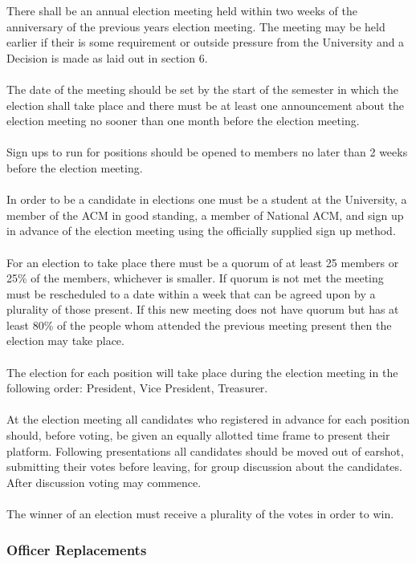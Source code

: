 \documentclass[12pt,titlepage]{article}
\begin{document}
There shall be an annual election meeting held within two weeks of the anniversary of the previous years election meeting. The meeting may be held earlier if their is some requirement or outside pressure from the University and a Decision is made as laid out in section 6.\\
\\
The date of the meeting should be set by the start of the semester in which the election shall take place and there must be at least one announcement about the election meeting no sooner than one month before the election meeting.\\
\\
Sign ups to run for positions should be opened to members no later than 2 weeks before the election meeting.\\
\\
In order to be a candidate in elections one must be a student at the University, a member of the ACM in good standing, a member of National ACM, and sign up in advance of the election meeting using the officially supplied sign up method.\\
\\
For an election to take place there must be a quorum of at least 25 members or 25\% of the members, whichever is smaller. If quorum is not met the meeting must be rescheduled to a date within a week that can be agreed upon by a plurality of those present. If this new meeting does not have quorum but has at least 80\% of the people whom attended the previous meeting present then the election may take place.\\
\\
The election for each position will take place during the election meeting in the following order: President, Vice President, Treasurer.\\
\\
At the election meeting all candidates who registered in advance for each position should, before voting, be given an equally allotted time frame to present their platform. Following presentations all candidates should be moved out of earshot, submitting their votes before leaving, for group discussion about the candidates. After discussion voting may commence.\\
\\
The winner of an election must receive a plurality of the votes in order to win.

\subsubsection{Officer Replacements}
\end{document}
